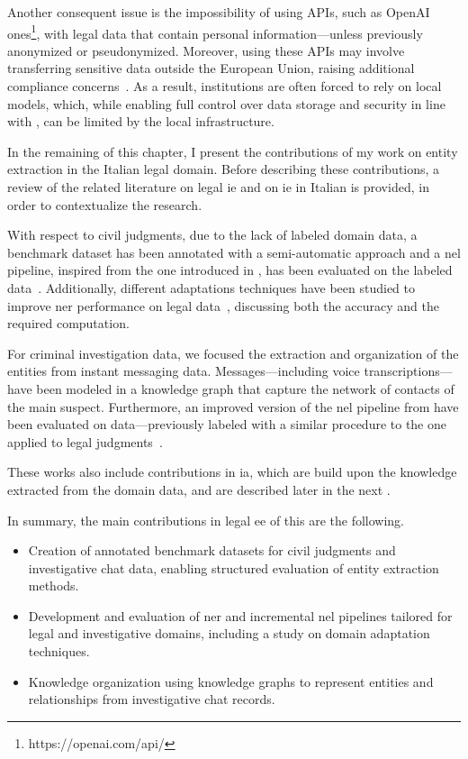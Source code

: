 Another consequent issue is the impossibility of using APIs, such as OpenAI ones\footnote{https://openai.com/api/}, with legal data that contain personal information---unless previously anonymized or pseudonymized. Moreover, using these APIs may involve transferring sensitive data outside the European Union, raising additional compliance concerns~\cite[Article~44]{gdpr2016}. As a result, institutions are often forced to rely on local models, which, while enabling full control over data storage and security in line with \textcite[Article~32]{gdpr2016}, can be limited by the local infrastructure.

In the remaining of this chapter, I present the contributions of my \phd work on entity extraction in the Italian legal domain.
Before describing these contributions, a review of the related literature on legal \ac{ie} and on \ac{ie} in Italian is provided, in order to contextualize the research.

With respect to civil judgments, due to the lack of labeled domain data, a benchmark dataset has been annotated with a semi-automatic approach and a \ac{nel} pipeline, inspired from the one introduced in , has been evaluated on the labeled data~\cite{BELLANDI2024}. Additionally, different adaptations techniques have been studied to improve \ac{ner} performance on legal data~\cite{aixia_2023}, discussing both the accuracy and the required computation.

For criminal investigation data, we focused the extraction and organization of the entities from instant messaging data. Messages---including voice transcriptions---have been modeled in a knowledge graph that capture the network of contacts of the main suspect. Furthermore, an improved version of the \ac{nel} pipeline from  have been evaluated on data---previously labeled with a similar procedure to the one applied to legal judgments~\cite{pozzi_wise_2025}.

These works also include contributions in \acl{ia}, which are build upon the knowledge extracted from the domain data, and are described later in the next .

In summary, the main contributions in legal \ac{ee} of this \phd are the following.
\begin{itemize}
    \item Creation of annotated benchmark datasets for civil judgments and investigative chat data, enabling structured evaluation of entity extraction methods.
    \item Development and evaluation of \ac{ner} and incremental \ac{nel} pipelines tailored for legal and investigative domains, including a study on domain adaptation techniques.
    \item Knowledge organization using knowledge graphs to represent entities and relationships from investigative chat records.
\end{itemize}